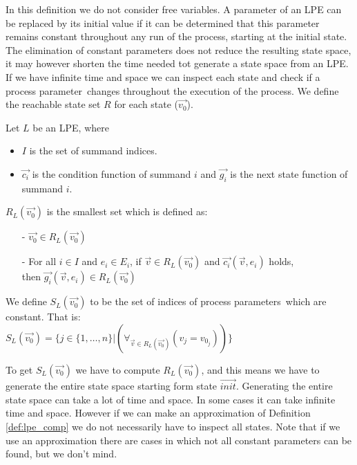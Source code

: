 \documentclass[a4paper,10pt]{article}
\theoremstyle{plain}
\theoremstyle{definition}
\newcommand{\ovr}{\overrightarrow}
\newcommand{\pp}{process parameter}
\newcommand{\pps}{process parameters}
\begin{document}
In this definition we do not consider free variables.
A parameter of an LPE can be replaced by its initial value if it can be determined that this parameter remains constant throughout any run of the process, starting at the initial state. The elimination of constant parameters does not reduce the resulting state space, it may however shorten the time needed tot generate a state space from an LPE. \\
If we have infinite time and space we can inspect each state and check if a \pp\ changes throughout the execution of the process. We define the reachable state set $R$ for each state ($\ovr{v_0}$). 
\begin{defn}\label{def:lpe} Let $L$ be an LPE, where\begin{itemize}
\item $I$ is the set of summand indices.
\item $\ovr{c_i}$ is the condition function of summand $i$ and $\ovr{g_i}$ is the next state function of summand $i$.
\end{itemize}

$R_L(\ovr{v_0})$ is the smallest set which is defined as:
  \begin{itemize}
    \item[-] $\ovr{v_0} \in R_L(\ovr{v_0})$
    \item[-] For all $i \in I$ and $e_i \in E_i$, if $\ovr{v} \in R_L(\ovr{v_0})$ and $\ovr{c_i}(\ovr{v}, e_i)$ holds, \\ then $\ovr{g_i}(\ovr{v}, e_i) \in R_L(\ovr{v_0})$ \\
   \end{itemize}
\end{defn}

\begin{defn}\label{def:lpe_comp} We define $S_L(\ovr{v_0})$ to be the set of indices of \pps\ which are constant. That is:\\

$S_L(\ovr{v_0}) = \lbrace j \in  \lbrace 1, \ldots, n \rbrace \vert (\forall_{\ovr{v} \in R_L(\ovr{v_0})}( v_j = v_{0_j})) \rbrace $
\end{defn}

To get $S_L(\ovr{v_0})$ we have to compute $R_L(\ovr{v_0})$, and this means we have to generate the entire state space starting form state $\ovr{init}$. Generating the entire state space can take a lot of time and space. In some cases it can take infinite time and space. However if we can make an approximation of Definition \ref{def:lpe_comp} we do not necessarily have to inspect all states. Note that if we use an approximation there are cases in which not all constant parameters can be found, but we don't mind.
\end{document}
